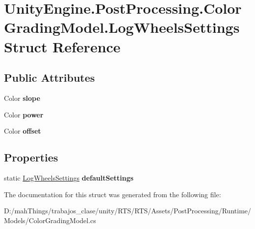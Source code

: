 \hypertarget{struct_unity_engine_1_1_post_processing_1_1_color_grading_model_1_1_log_wheels_settings}{}\section{Unity\+Engine.\+Post\+Processing.\+Color\+Grading\+Model.\+Log\+Wheels\+Settings Struct Reference}
\label{struct_unity_engine_1_1_post_processing_1_1_color_grading_model_1_1_log_wheels_settings}
\subsection*{Public Attributes}
\begin{DoxyCompactItemize}
\item 
\mbox{\label{struct_unity_engine_1_1_post_processing_1_1_color_grading_model_1_1_log_wheels_settings_a7f494c64bb76d4f2ff2964062444fadb}} 
Color {\bfseries slope}
\item 
\mbox{\label{struct_unity_engine_1_1_post_processing_1_1_color_grading_model_1_1_log_wheels_settings_adf368213cad3dabd7d738f0107d31089}} 
Color {\bfseries power}
\item 
\mbox{\label{struct_unity_engine_1_1_post_processing_1_1_color_grading_model_1_1_log_wheels_settings_ad89a46fb9a7ad450ecd2687fcde2b02c}} 
Color {\bfseries offset}
\end{DoxyCompactItemize}
\subsection*{Properties}
\begin{DoxyCompactItemize}
\item 
\mbox{\label{struct_unity_engine_1_1_post_processing_1_1_color_grading_model_1_1_log_wheels_settings_ab7c51b8a45966521c63d4817f71b86dd}} 
static \mbox{\hyperlink{struct_unity_engine_1_1_post_processing_1_1_color_grading_model_1_1_log_wheels_settings}{Log\+Wheels\+Settings}} {\bfseries default\+Settings}
\end{DoxyCompactItemize}


The documentation for this struct was generated from the following file\+:\begin{DoxyCompactItemize}
\item 
D\+:/mah\+Things/trabajos\+\_\+clase/unity/\+R\+T\+S/\+R\+T\+S/\+Assets/\+Post\+Processing/\+Runtime/\+Models/Color\+Grading\+Model.\+cs\end{DoxyCompactItemize}
